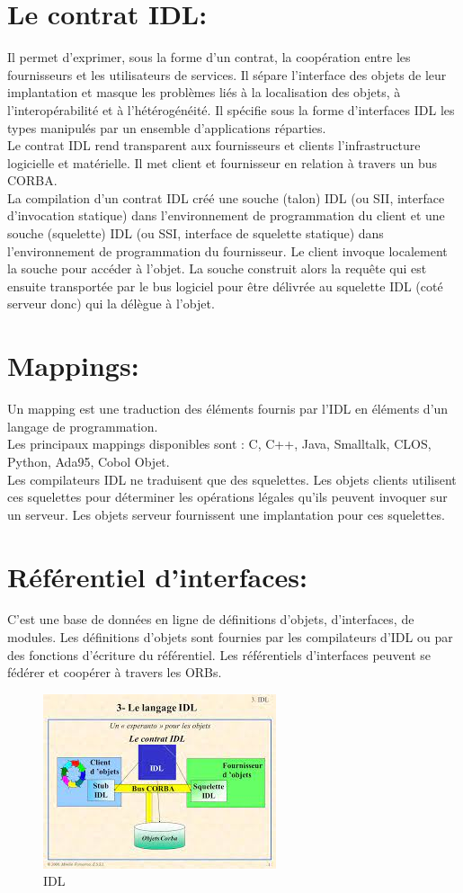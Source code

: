 \section{Le contrat IDL:}
Il permet d'exprimer, sous la forme d'un contrat, la coopération entre les fournisseurs et les utilisateurs de services. Il sépare l'interface des objets de leur implantation et masque les problèmes liés à la localisation des objets, à l'interopérabilité et à l'hétérogénéité. Il spécifie sous la forme d'interfaces IDL les types manipulés par un ensemble d'applications réparties.\\
Le contrat IDL rend transparent aux fournisseurs et clients l'infrastructure logicielle et matérielle. Il met client et fournisseur en relation à travers un bus CORBA.\\
La compilation d'un contrat IDL créé une souche (talon) IDL (ou SII, interface d'invocation statique) dans l'environnement de programmation du client et une souche (squelette) IDL (ou SSI, interface de squelette statique) dans l'environnement de programmation du fournisseur.
Le client invoque localement la souche pour accéder à l'objet. La souche construit alors la requête qui est ensuite transportée par le bus logiciel pour être délivrée au squelette IDL (coté serveur donc) qui la délègue à l'objet.\\

\section{Mappings:}
Un mapping est une traduction des éléments fournis par l'IDL en éléments d'un langage de programmation.\\
Les principaux mappings disponibles sont : C, C++, Java, Smalltalk, CLOS, Python, Ada95, Cobol Objet.\\
Les compilateurs IDL ne traduisent que des squelettes. Les objets clients utilisent ces squelettes pour déterminer les opérations légales qu'ils peuvent invoquer sur un serveur. Les objets serveur fournissent une implantation pour ces squelettes.

\section{Référentiel d'interfaces:}
C'est une base de données en ligne de définitions d'objets, d'interfaces, de modules. Les définitions d'objets sont fournies par les compilateurs d'IDL ou par des fonctions d'écriture du référentiel.
Les référentiels d'interfaces peuvent se fédérer et coopérer à travers les ORBs.

\vspace*{2cm}

\begin{figure}[h]
        \centering
     \includegraphics[scale= 1]{IDL/3}
        \caption{IDL}
\end{figure}
